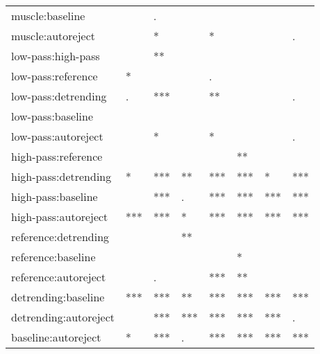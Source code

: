 \begin{table}[!htp]
\begin{widestuff}
\begin{tabular}{llllllll}
  muscle:baseline &   & . &   &   &   &   &   \\ 
  muscle:autoreject &   & * &   & * &   &   & . \\ 
  low-pass:high-pass &   & ** &   &   &   &   &   \\ 
  low-pass:reference & * &   &   & . &   &   &   \\ 
  low-pass:detrending & . & *** &   & ** &   &   & . \\ 
  low-pass:baseline &   &   &   &   &   &   &   \\ 
  low-pass:autoreject &   & * &   & * &   &   & . \\ 
  high-pass:reference &   &   &   &   & ** &   &   \\ 
  high-pass:detrending & * & *** & ** & *** & *** & * & *** \\ 
  high-pass:baseline &   & *** & . & *** & *** & *** & *** \\ 
  high-pass:autoreject & *** & *** & * & *** & *** & *** & *** \\ 
  reference:detrending &   &   & ** &   &   &   &   \\ 
  reference:baseline &   &   &   &   & * &   &   \\ 
  reference:autoreject &   & . &   & *** & ** &   &   \\ 
  detrending:baseline & *** & *** & ** & *** & *** & *** & *** \\ 
  detrending:autoreject &   & *** & *** & *** & *** & *** & . \\ 
  baseline:autoreject & * & *** & . & *** & *** & *** & *** \\ 
   \hline
\end{tabular}
\end{widestuff}
\end{table}
